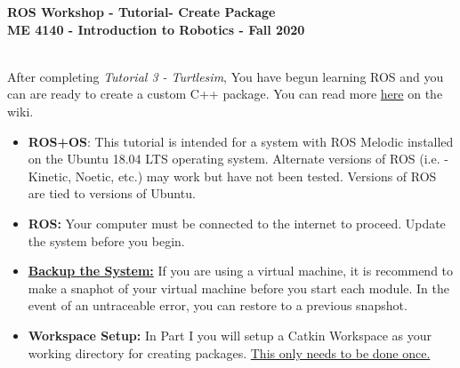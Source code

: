 \documentclass[12pt]{article}
\newcommand{\MNUM}{4} %
\newcommand{\MNAME}{Create Package} %
\begin{document}
\thispagestyle{plain}

\begin{center}
   {\bf \Large ROS Workshop - Tutorial\hspc\MNUM\hspc - \MNAME}\vspace{3mm}\\
   {\bf \large ME 4140 - Introduction to Robotics - Fall 2020} \vspace{5mm}\\
\end{center}

\begin{description}[labelindent=1cm]
	
	\item[\textbf{\underline{Overview:}}] \hfill \vspace{3mm}\\
	After completing {\it Tutorial 3 - Turtlesim}, You have begun learning ROS and you can are ready to create a custom C++ package. You can read more \href{http://wiki.ros.org/catkin/Tutorials/create_a_workspace}{here} on the wiki.
	
	\item[\textbf{\underline{System Requirements:}}] \hfill \vspace{0mm}

\begin{itemize}
	\item {\bf ROS+OS}: This tutorial is intended for a system with ROS Melodic installed on the Ubuntu 18.04 LTS operating system. Alternate versions of ROS (i.e. - Kinetic, Noetic, etc.) may work but have not been tested. Versions of ROS are tied to versions of Ubuntu.
	\item {\bf ROS:} Your computer must be connected to the internet to proceed. Update the system before you begin.
\end{itemize}

	
	\item[\textbf{\underline{Disclaimer:}}] \hfill \vspace{0mm}
	
	\begin{itemize}

		\item {\R\underline{\bf Backup the System:}} If you are using a virtual machine, it is recommend to make a snaphot of your virtual machine before you start each module. In the event of an untraceable error, you can restore to a previous snapshot. 
		
		\item {\bf Workspace Setup:} In Part I you will setup a Catkin Workspace as your working directory for creating packages. {\G \underline {This only needs to be done once.}}  
	\end{itemize}


\end{description}
\end{document}
